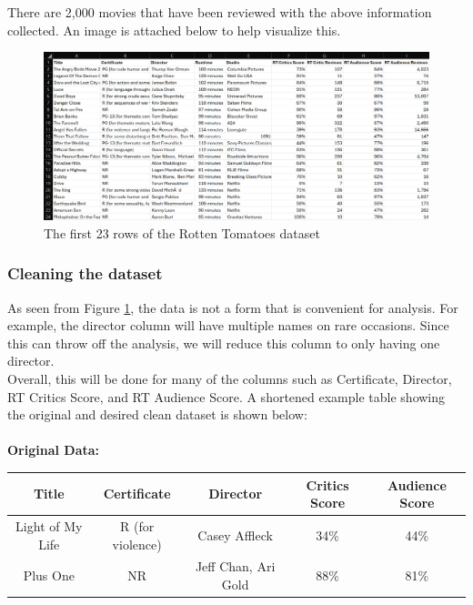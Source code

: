 \documentclass[12pt]{article}
\begin{document}
\noindent There are 2,000 movies that have been reviewed with the above information collected. An image is attached below to help visualize this. \\

\begin{figure}[h]
\begin{center}
      \includegraphics[width=5.2in]{figure1.png}
      \caption{The first 23 rows of the Rotten Tomatoes dataset}
      \label{Figure 1}
\end{center}
\end{figure}

\newpage

\subsubsection{Cleaning the dataset}
As seen from Figure \ref{Figure 1}, the data is not a form that is convenient for analysis. For example, the director column will have multiple names on rare occasions. Since this can throw off the analysis, we will reduce this column to only having one director. \\

\noindent Overall, this will be done for many of the columns such as Certificate, Director, RT Critics Score, and RT Audience Score. A shortened example table showing the original and desired clean dataset is shown below: \\ \\

\noindent \textbf{Original Data:}
\begin{center}
\begin{tabular}{|c|c|c|c|c|} 
\hline
\textbf{Title} & \textbf{Certificate} & \textbf{Director} & \textbf{Critics Score} & \textbf{Audience Score} \\
\hline
Light of My Life & R (for violence) & Casey Affleck & 34\% & 44\% \\
\hline
Plus One & NR & Jeff Chan,  Ari Gold & 88\% & 81\% \\
\hline
\end{tabular}
\end{center}
\end{document}
